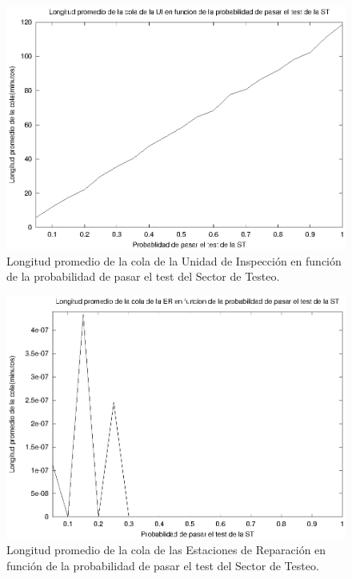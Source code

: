 \documentclass[a4paper,10pt]{article}
\begin{document}
\begin{figure}[ht]
\begin{center}
\includegraphics[width=15cm]{./img/ql_UI.eps}
\caption{\label{fig:ql_UI} Longitud promedio de la cola de la Unidad de Inspecci\'on en funci\'on de la probabilidad de pasar el test del Sector de Testeo.}
\end{center}
\end{figure}

\begin{figure}[ht]
\begin{center}
\includegraphics[width=15cm]{./img/ql_ER.eps}
\caption{\label{fig:ql_ER} Longitud promedio de la cola de las Estaciones de Reparaci\'on en funci\'on de la probabilidad de pasar el test del Sector de Testeo.}
\end{center}
\end{figure}
\end{document}
